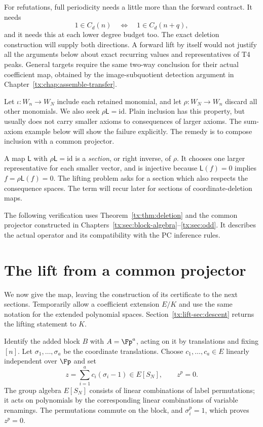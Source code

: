 For refutations, full periodicity needs a little more than the forward
contract. It needs
\begin{equation}\label{tx:eq:newiff}
 1\in C_d(n)\quad\Longleftrightarrow\quad1\in C_d(n+q),
\end{equation}
and it needs this at each lower degree budget too. The exact deletion
construction will supply both directions. A forward lift by itself
would not justify all the arguments below about exact recurring values and representatives of T4 peaks. General targets require the same two-way conclusion for their actual coefficient map, obtained by the image-subquotient detection argument in Chapter~\ref{tx:chap:assemble-transfer}.

Let $\iota:W_n\to W_N$ include each retained monomial, and let
$\rho:W_N\to W_n$ discard all other monomials. We also seek
$\rho\mathsf L=\mathrm{id}$. Plain inclusion has this property, but
usually does not carry smaller axioms to consequences of larger axioms.
The sum-axiom example below will show the failure
explicitly. The remedy is to compose inclusion with a common projector.

A map $\mathsf L$ with $\rho\mathsf L=\mathrm{id}$ is a
\emph{section}, or right inverse, of $\rho$. It chooses one larger
representative for each smaller vector, and is injective because
$\mathsf L(f)=0$ implies $f=\rho\mathsf L(f)=0$.
The lifting problem asks for a section which also respects the
consequence spaces. The term will recur later for sections of
coordinate-deletion maps.

The following verification uses Theorem~\ref{tx:thm:deletion} and the common projector constructed in Chapters~\ref{tx:sec:block-algebra}--\ref{tx:sec:odd}. It describes the actual operator and its compatibility with the PC inference rules.

\section{The lift from a common projector}\label{tx:lift-sec:formula}
We now give the map, leaving the construction of its certificate to the
next sections. Temporarily allow a coefficient extension $E/K$ and use
the same notation for the extended polynomial spaces. Section~\ref{tx:lift-sec:descent}
returns the lifting statement to $K$.

Identify the added block $B$ with $A=\Fp^a$, acting on it by translations
and fixing $[n]$. Let $\sigma_1,\ldots,\sigma_a$ be the coordinate
translations. Choose $c_1,\ldots,c_a\in E$ linearly independent over
$\Fp$ and set
\[
 z=\sum_{i=1}^a c_i(\sigma_i-1)\in E[S_N],\qquad z^p=0.
\]
The group algebra $E[S_N]$ consists of linear combinations of label
permutations; it acts on polynomials by the corresponding linear
combinations of variable renamings. The permutations commute on the
block, and $\sigma_i^p=1$, which proves $z^p=0$.

